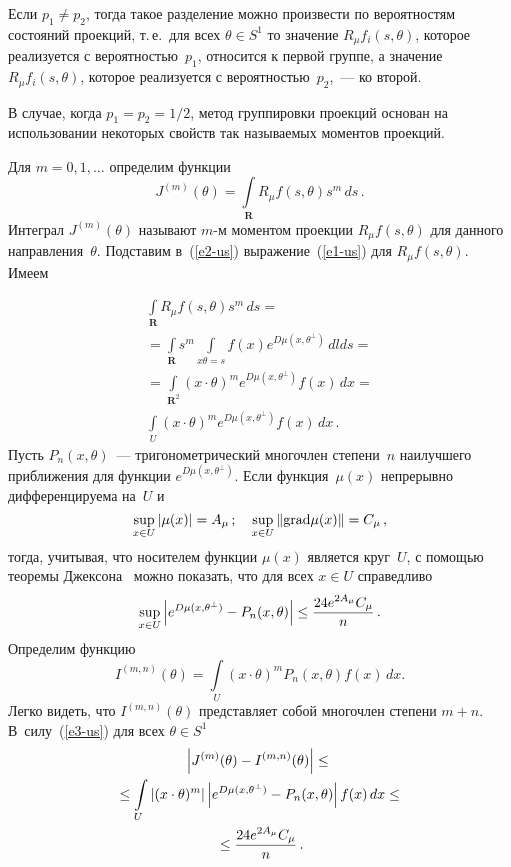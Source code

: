 \begin{multicols}{2}
Если $p_{1}\neq p_{2}$, тогда
такое разделение можно произвести по вероятностям состояний
проекций, т.\,е.\ для всех $\theta\in S^1$ то значение
$R_\mu f_{i}(s,\theta)$, которое реализуется с вероятностью~$p_{1}$,
относится к первой группе, а значение $R_\mu f_{i}(s,\theta)$, которое
реализуется с вероятностью~$p_{2}$,~--- ко второй.

В случае, когда $p_{1}=p_{2}=1/2$, метод группировки проекций
основан на использовании некоторых свойств так называемых моментов проекций.

Для $m=0,1,\ldots$ определим функции
\begin{equation}
J^{(m)}(\theta)=\int\limits_{\mathbf{R}}R_\mu f(s,\theta)s^{m}\,ds\,.
\label{e2-us}
\end{equation}
Интеграл $J^{(m)}(\theta)$ называют $m$-м моментом проекции
$R_\mu f(s,\theta)$ для данного направления~$\theta$. Подставим в~(\ref{e2-us})
выражение~(\ref{e1-us}) для $R_\mu f(s,\theta)$. Имеем

\noindent
\begin{multline*}
\int\limits_{\mathbf{R}}R_\mu f(s,\theta)s^{m}\,ds={}\\
{}=\int\limits_{\mathbf{R}}s^{m}\int\limits_{x\theta=s}f(x)e^{D\mu(x,\theta^{\perp})}\,dlds={}\\
{}=
\int\limits_{\mathbf{R}^2}(x\cdot \theta)^m e^{D\mu(x,\theta^{\perp})} f(x)\,dx={}\\
\int\limits_{U}(x\cdot \theta)^m e^{D\mu(x,\theta^{\perp})} f(x)\,dx\,.
\end{multline*}
Пусть $P_n(x,\theta)$~--- тригонометрический многочлен степени~$n$ 
наилучшего приближения для функции $e^{D\mu(x,\theta^{\perp})}$. 
Если функция~$\mu(x)$ непрерывно дифференцируема на~$U$ и
\begin{equation*}
\sup\limits_{x\in U}\left\vert\mu(x)\right\vert=A_\mu\,;\quad
\sup\limits_{x\in U}\left\Vert\mbox{grad}\mu(x)\right\Vert=C_\mu\,,
\end{equation*}
тогда, учитывая, что носителем функции $\mu(x)$ является круг~$U$, 
с помощью теоремы Джексона~\cite{11-us} можно показать, что для всех $x\in U$ справедливо
\begin{equation}
\sup\limits_{x\in U}\left\vert e^{D\mu(x,\theta^{\perp})}-P_n(x,\theta)\right\vert\leq
\displaystyle\frac{\displaystyle 24e^{2A_\mu}C_\mu\mathstrut}{\displaystyle n\mathstrut}\,.
\label{e3-us}
\end{equation}
Определим функцию
\begin{equation}
I^{(m,n)}(\theta)=\int\limits_{U}(x \cdot\theta)^m P_n(x,\theta) f(x)\,dx.
\label{e4-us}
\end{equation}
Легко видеть, что $I^{(m,n)}(\theta)$ представляет собой многочлен степени $m+n$. 
В~силу~(\ref{e3-us}) для всех $\theta\in S^1$
\begin{multline}
\left\vert J^{(m)}(\theta)-I^{(m,n)}(\theta)\right\vert\leq{}
\\ {}\leq
\int\limits_{U}\left\vert(x\cdot \theta)^m\right\vert\left\vert e^{D\mu(x,\theta^{\perp})}-
P_n(x,\theta)\right\vert f(x)\,dx\leq{}\\
{}\leq\displaystyle\frac{\displaystyle 24e^{2A_\mu}C_\mu\mathstrut}{\displaystyle n\mathstrut}\,.
\label{e5-us}
\end{multline}


\end{multicols}
